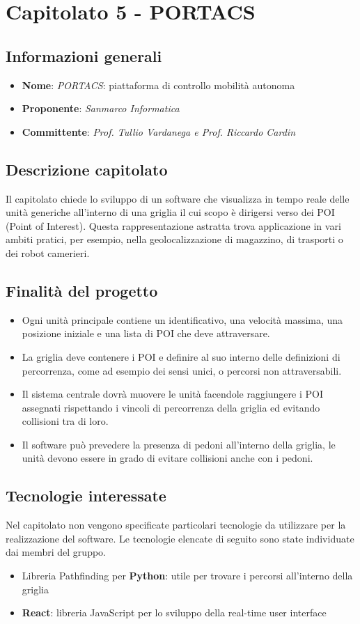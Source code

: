 \section{Capitolato 5 - PORTACS}
\subsection{Informazioni generali}
\begin{itemize}
    \item \textbf{Nome}: \emph{PORTACS}: piattaforma di controllo mobilità autonoma
    \item \textbf{Proponente}: \emph{Sanmarco Informatica}
    \item \textbf{Committente}: \emph{Prof. Tullio Vardanega e Prof. Riccardo Cardin}
\end{itemize}
\subsection{Descrizione capitolato}
Il capitolato chiede lo sviluppo di un software che visualizza in tempo reale delle unità generiche all'interno di una griglia il cui scopo è dirigersi verso dei POI (Point of Interest). Questa rappresentazione astratta trova applicazione in vari ambiti pratici, per esempio, nella geolocalizzazione di magazzino, di trasporti o dei robot camerieri.
\subsection{Finalità del progetto}
\begin{itemize}
    \item Ogni unità principale contiene un identificativo, una velocità massima, una posizione iniziale e una lista di POI che deve attraversare.
    \item La griglia deve contenere i POI e definire al suo interno delle definizioni di percorrenza, come ad esempio dei sensi unici, o percorsi non attraversabili.
    \item Il sistema centrale dovrà muovere le unità facendole raggiungere i POI assegnati rispettando i vincoli di percorrenza della griglia ed evitando collisioni tra di loro.
    \item Il software può prevedere la presenza di pedoni all'interno della griglia, le unità devono essere in grado di evitare collisioni anche con i pedoni.
\end{itemize}
\subsection{Tecnologie interessate}
Nel capitolato non vengono specificate particolari tecnologie da utilizzare per la realizzazione del software. Le tecnologie elencate di seguito sono state individuate dai membri del gruppo.
\begin{itemize}
    \item Libreria Pathfinding per \textbf{Python}: utile per trovare i percorsi all’interno della griglia
    \item \textbf{React}: libreria JavaScript per lo sviluppo della real-time user interface
\end{itemize}
